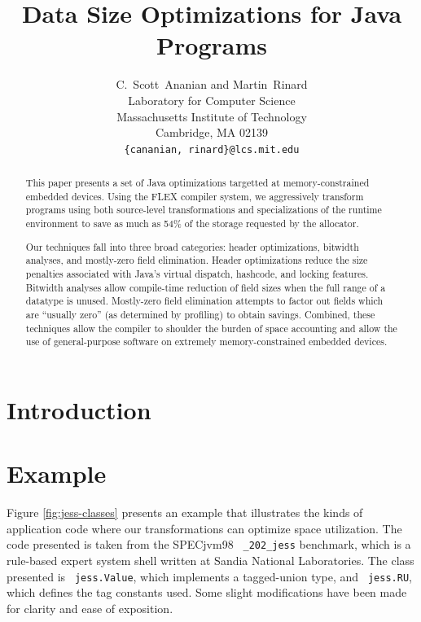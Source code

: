 \documentclass[preprint]{acmconf}
\title{\bf Data Size Optimizations for Java Programs}
\author{C.~Scott~Ananian and Martin~Rinard\\
        Laboratory for Computer Science\\
        Massachusetts Institute of Technology\\ 
        Cambridge, MA 02139 \\ 
        {\tt \{cananian, rinard\}@lcs.mit.edu} }
\begin{document}


\maketitle

\begin{abstract}

This paper presents a set of Java optimizations targetted at
memory-constrained embedded devices.  Using the FLEX compiler system,
we aggressively transform
programs using both source-level transformations and
specializations of the runtime environment to save as much
as 54\% of the storage requested by the allocator.

Our techniques fall into three broad categories: header optimizations,
bitwidth analyses, and mostly-zero field elimination.  Header
optimizations reduce the size penalties associated with 
Java's virtual dispatch, hashcode, and locking features.  Bitwidth
analyses allow compile-time reduction of field sizes when the
full range of a datatype is unused.  Mostly-zero field elimination
attempts to factor out fields which are ``usually zero'' (as
determined by profiling) to obtain savings.  Combined, these
techniques allow the compiler to shoulder the burden of space accounting
and allow the use of general-purpose software on extremely
memory-constrained embedded devices.

\end{abstract}

\section{Introduction}

\section{Example}
Figure \ref{fig:jess-classes} presents an example that illustrates the
kinds of application code where our transformations can optimize space
utilization.  The code presented is taken from the SPECjvm98 {\tt
  \_202\_jess} benchmark, which is a rule-based expert system shell
written at Sandia National Laboratories.  The class presented is {\tt
  jess.Value}, which implements a tagged-union type, and {\tt
  jess.RU}, which defines the tag constants used.  Some slight
modifications have been made for clarity and ease of exposition.
\end{document}
